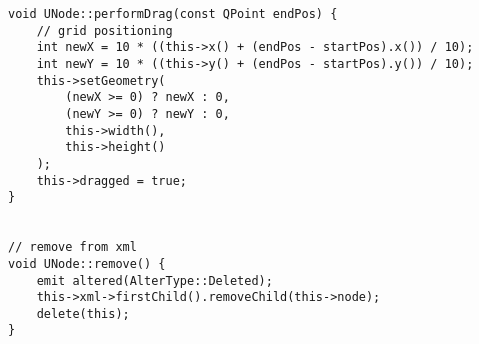 \begin{lstlisting}
void UNode::performDrag(const QPoint endPos) {
    // grid positioning
    int newX = 10 * ((this->x() + (endPos - startPos).x()) / 10);
    int newY = 10 * ((this->y() + (endPos - startPos).y()) / 10);
    this->setGeometry(
        (newX >= 0) ? newX : 0,
        (newY >= 0) ? newY : 0,
        this->width(),
        this->height()
    );
    this->dragged = true;
}


// remove from xml
void UNode::remove() {
    emit altered(AlterType::Deleted);
    this->xml->firstChild().removeChild(this->node);
    delete(this);
}
\end{lstlisting}